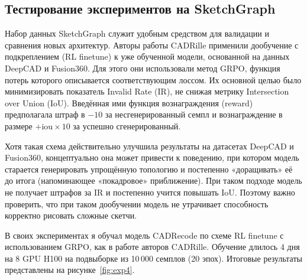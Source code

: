 \newpage

\subsection{Тестирование экспериментов на SketchGraph}

Набор данных SketchGraph служит удобным средством для валидации и сравнения новых архитектур. Авторы работы CADRille применили дообучение с подкреплением (RL finetune) к уже обученной модели, основанной на данных DeepCAD и Fusion360. Для этого они использовали метод GRPO, функция потерь которого описывается соответствующим лоссом. Их основной целью было минимизировать показатель Invalid Rate (IR), не снижая метрику Intersection over Union (IoU). Введённая ими функция вознаграждения (reward) предполагала штраф в \(-10\) за несгенерированный семпл и вознаграждение в размере \(+ \mathrm{iou} \times 10\) за успешно сгенерированный.

Хотя такая схема действительно улучшила результаты на датасетах DeepCAD и Fusion360, концептуально она может привести к поведению, при котором модель старается генерировать упрощённую топологию и постепенно «доращивать» её до итога (напоминающее «покадровое» приближение). При таком подходе модель не получает штрафов за IR и постепенно учится повышать IoU. Поэтому важно проверить, что при таком дообучении модель не утрачивает способность корректно рисовать сложные скетчи.

В своих экспериментах я обучал модель CADRecode по схеме RL finetune с использованием GRPO, как в работе авторов CADRille. Обучение длилось 4 дня на 8 GPU H100 на подвыборке из 10\,000 семплов (20 эпох). Итоговые результаты представлены на рисунке~\ref{fig:exp4}.

